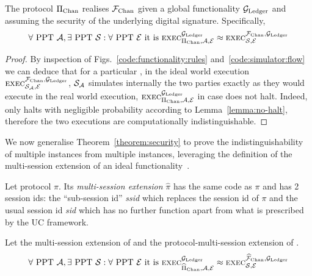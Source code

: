 \begin{theorem}
  \label{theorem:security}
  The protocol $\Pi_{\mathrm{Chan}}$ realises $\mathcal{F}_{\mathrm{Chan}}$ given a global functionality
  $\mathcal{G}_{\mathrm{Ledger}}$ and assuming the security of the underlying digital signature.
  Specifically,
  \begin{gather*}
    \forall \text{ PPT } \mathcal{A}, \exists \text{ PPT } \mathcal{S}: \forall
    \text{ PPT } \mathcal{E} \text{ it is }
    \textsc{exec}^{\mathcal{G}_{\mathrm{Ledger}}}_{\Pi_{\mathrm{Chan}}, \mathcal{A}, \mathcal{E}} \approx
    \textsc{exec}^{\mathcal{F}_{\mathrm{Chan}}, \mathcal{G}_{\mathrm{Ledger}}}_{\mathcal{S}, \mathcal{E}}
  \end{gather*}
\end{theorem}

\begin{proof}
  By inspection of Figs.~\ref{code:functionality:rules}
  and~\ref{code:simulator:flow} we can deduce that for a particular
  \environment, in the ideal world execution $\textsc{exec}^{\mathcal{F}_{\mathrm{Chan}},
  \mathcal{G}_{\mathrm{Ledger}}}_{\mathcal{S}_{\mathcal{A}}, \mathcal{E}}$, $\mathcal{S}_{\mathcal{A}}$
  simulates internally the two \pchan parties exactly as they would execute
  in the real world execution, $\textsc{exec}^{\mathcal{G}_{\mathrm{Ledger}}}_{\Pi_{\mathrm{Chan}},
  \mathcal{A}, \mathcal{E}}$ in case \fchan does not halt. Indeed, \fchan only
  halts with negligible probability according to Lemma~\ref{lemma:no-halt},
  therefore the two executions are computationally indistinguishable.
\end{proof}

We now generalise Theorem~\ref{theorem:security} to prove the
indistinguishability of multiple \fchan instances from multiple \pchan
instances, leveraging the definition of the multi-session extension of an ideal
functionality~\cite{DBLP:conf/crypto/CanettiR03}.

\begin{definition}
  Let protocol $\pi$. Its \emph{multi-session extension} $\hat{\pi}$ has the
  same code as $\pi$ and has 2 session ids: the ``sub-session id''
  \emph{ssid} which replaces the session id of $\pi$ and the usual session id
  \emph{sid} which has no further function apart from what is prescribed by the
  UC framework.
\end{definition}

\begin{theorem}
  Let \fchanhat the multi-session extension of \fchan and \pchanhat the
  protocol-multi-session extension of \pchan.
  \begin{gather*}
    \forall \text{ PPT } \mathcal{A}, \exists \text{
    PPT } \mathcal{S}: \forall \text{ PPT } \mathcal{E} \text{ it is }
    \textsc{exec}^{\mathcal{G}_{\mathrm{Ledger}}}_{\widehat{\Pi}_{\mathrm{Chan}}, \mathcal{A}, \mathcal{E}} \approx
    \textsc{exec}^{\widehat{\mathcal{F}}_{\mathrm{Chan}}, \mathcal{G}_{\mathrm{Ledger}}}_{\mathcal{S}, \mathcal{E}}
  \end{gather*}
\end{theorem}

